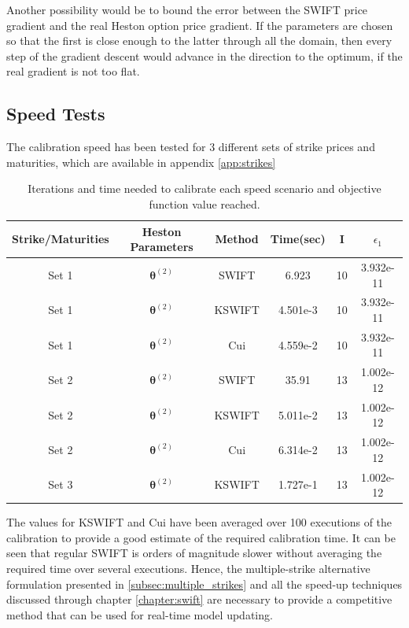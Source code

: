 \documentclass[12,twoside]{mammeTFM}
\theoremstyle{definition}
\theoremstyle{remark}
\begin{document}
Another possibility would be to bound the error between the SWIFT price gradient and the real Heston option price gradient. If the parameters are chosen so that the first is close enough to the latter through all the domain, then every step of the gradient descent would advance in the direction to the optimum, if the real gradient is not too flat.

\subsection{Speed Tests}\label{subsec:speed}

The calibration speed has been tested for 3 different sets of strike prices and maturities, which are available in appendix \ref{app:strikes}

\begin{table}[!h]
\begin{center}
 \begin{tabular}{|c | c | c | c | c | c |} 
 \hline
 Strike/Maturities & Heston Parameters & Method & Time(sec) & I & $\epsilon_1$ \\ [0.5ex] 
 \hline
 Set 1 & $\boldsymbol{\theta}^{(2)}$ & SWIFT & 6.923 & 10 & 3.932e-11 \\ 
 \hline
 Set 1 & $\boldsymbol{\theta}^{(2)}$ & KSWIFT & 4.501e-3 & 10 & 3.932e-11 \\
 \hline
 Set 1 & $\boldsymbol{\theta}^{(2)}$ & Cui & 4.559e-2 & 10 & 3.932e-11 \\
 \hline
 Set 2 & $\boldsymbol{\theta}^{(2)}$ & SWIFT & 35.91 & 13 & 1.002e-12 \\
 \hline
 Set 2 & $\boldsymbol{\theta}^{(2)}$ & KSWIFT & 5.011e-2 & 13 & 1.002e-12 \\
 \hline
 Set 2 & $\boldsymbol{\theta}^{(2)}$ & Cui & 6.314e-2 & 13 & 1.002e-12 \\
 \hline
 Set 3 & $\boldsymbol{\theta}^{(2)}$ & KSWIFT  & 1.727e-1 & 13 & 1.002e-12\\
 \hline
\end{tabular}
\caption{Iterations and time needed to calibrate each speed scenario and objective function value reached.}\label{table:speed}
\end{center}
\end{table}

The values for KSWIFT and Cui have been averaged over 100 executions of the calibration to provide a good estimate of the required calibration time. It can be seen that regular SWIFT is orders of magnitude slower without averaging the required time over several executions. Hence, the multiple-strike alternative formulation presented in \ref{subsec:multiple_strikes} and all the speed-up techniques discussed through chapter \ref{chapter:swift} are necessary to provide a competitive method that can be used for real-time model updating.
\end{document}
